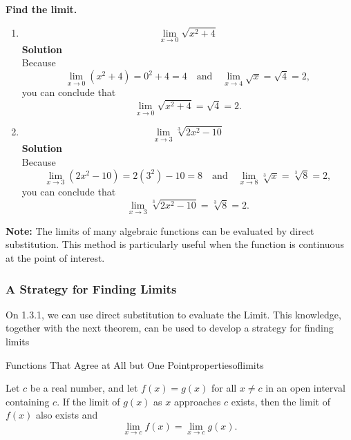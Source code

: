 \documentclass[12pt]{article}
\theoremstyle{beautifulthm}
\begin{document}
\begin{tcolorbox}[colback=examplebg, colframe=red!75!black, title=\textbf{EXAMPLE 4: The Limit of a Composite Function} fonttitle=\bfseries, sharp corners]
\textbf{Find the limit.}


\begin{enumerate}
    \item[(a)] 
    \[
    \lim_{x \to 0} \sqrt{x^2 + 4}
    \]
    \textbf{Solution} \\

    Because
    \[
    \lim_{x \to 0} (x^2 + 4) = 0^2 + 4 = 4 \quad \text{and} \quad \lim_{x \to 4} \sqrt{x} = \sqrt{4} = 2,
    \]
    you can conclude that
    \[
    \lim_{x \to 0} \sqrt{x^2 + 4} = \sqrt{4} = 2.
    \]

    \item[(b)] 
    \[
    \lim_{x \to 3} \sqrt[3]{2x^2 - 10}
    \]
    \textbf{Solution} \\
    \hrulefill %
    \smallskip %
    Because
    \[
    \lim_{x \to 3} (2x^2 - 10) = 2(3^2) - 10 = 8 \quad \text{and} \quad \lim_{x \to 8} \sqrt[3]{x} = \sqrt[3]{8} = 2,
    \]
    you can conclude that
    \[
    \lim_{x \to 3} \sqrt[3]{2x^2 - 10} = \sqrt[3]{8} = 2.
    \]
\end{enumerate}

\end{tcolorbox}

\noindent \textbf{Note:} The limits of many algebraic functions can be evaluated by direct substitution. This method is particularly useful when the function is continuous at the point of interest.

\subsubsection{A Strategy for Finding Limits}
On 1.3.1, we can use direct substitution to evaluate the Limit. This knowledge, together with the next theorem, can be used to develop a strategy for finding limits

\begin{mytheorem}{Functions That Agree at All but One Point}{propertiesoflimits}
\textbf{}

Let \( c \) be a real number, and let \( f(x) = g(x) \) for all \( x \neq c \) in an open interval containing \( c \). If the limit of \( g(x) \) as \( x \) approaches \( c \) exists, then the limit of \( f(x) \) also exists and
\[
\lim_{x \to c} f(x) = \lim_{x \to c} g(x).
\]
\end{mytheorem}
\end{document}
